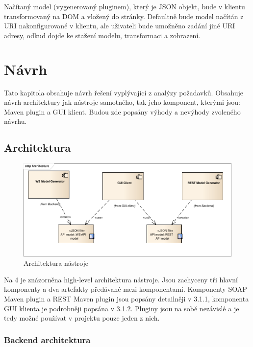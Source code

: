 \documentclass[11pt,twoside,a4paper]{book}
\begin{document}
Načítaný model (vygenerovaný pluginem), který je JSON objekt, bude v klientu
transformovaný na DOM a vložený do stránky. Defaultně bude model načítán z URI
nakonfigurované v klientu, ale uživateli bude umožněno zadání jiné URI adresy, odkud dojde
ke stažení modelu, transformaci a zobrazení.

\chapter{Návrh}

Tato kapitola obsahuje návrh řešení vyplývající z analýzy požadavků. Obsahuje návrh
architektury jak nástroje samotného, tak jeho komponent, kterými jsou: Maven plugin a GUI
klient. Budou zde popsány výhody a nevýhody zvoleného návrhu.

\section{Architektura}

\begin{figure}[h]
\begin{center}
\includegraphics[width=13cm]{images-pdf/Architecture.pdf}
\caption{Architektura nástroje}
\label{fig:logo}
\end{center}
\end{figure}

Na 4 je znázorněna high-level architektura nástroje. Jsou zachyceny tři hlavní komponenty a
dva artefakty předávané mezi komponentami. Komponenty SOAP Maven plugin a REST
Maven plugin jsou popsány detailněji v 3.1.1, komponenta GUI klienta je podrobněji popsána
v 3.1.2. Pluginy jsou na sobě nezávislé a je tedy možné používat v projektu pouze jeden z
nich.

\subsection{Backend architektura}
\end{document}

